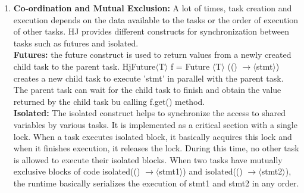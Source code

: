 \begin{enumerate}
%

\item \textbf{Co-ordination and Mutual Exclusion: } A lot of times, task creation and execution depends on the data available to the tasks or the order of execution of other tasks. HJ provides different constructs for synchronization between tasks such as futures and isolated. \\
\textbf{Futures:} the future construct is used to return values from a newly created child task to the parent task. HjFuture$\langle$T$\rangle$ f = Future $\langle$T$\rangle$ (() $ \rightarrow \langle$stmt$\rangle$) creates a new child task to execute 'stmt' in parallel with the parent task. The parent task can wait for the child task to finish and obtain the value returned by the child task bu calling f.get() method. \\
\textbf{Isolated:} The isolated construct helps to synchronize the access to shared variables by various tasks. It is implemented as a critical section with a single lock. When a task executes isolated block, it basically acquires this lock and when it finishes execution, it releases the lock. During this time, no other task is allowed to execute their isolated blocks. When two tasks have mutually exclusive blocks of code  isolated(() $ \rightarrow \langle$stmt1$\rangle$) and  isolated(() $ \rightarrow \langle$stmt2$\rangle$), the runtime basically serializes the execution of stmt1 and stmt2 in any order.


\end{enumerate}
